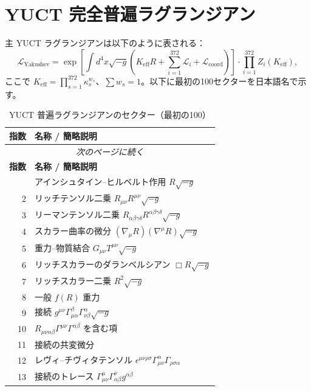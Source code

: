 \documentclass[13pt,a4paper]{ltjsarticle}
\begin{document}
	\section{YUCT 完全普遍ラグランジアン}
	主 YUCT ラグランジアンは以下のように表される：
	\begin{equation}
		\mathcal{L}_{\text{Yakushev}} = \exp\left[\int d^4x\sqrt{-g}\left(K_{\mathrm{eff}}R + \sum_{i=1}^{372}\mathcal{L}_i + \mathcal{L}_{\text{coord}}\right)\right] \cdot \prod_{i=1}^{372} Z_i(K_{\mathrm{eff}}),
	\end{equation}
	ここで \(K_{\mathrm{eff}} = \prod_{s=1}^{372} \kappa_s^{w_s}\)、\(\sum w_s = 1\)。以下に最初の100セクターを日本語名で示す。
	\scriptsize
	\begin{longtable}{r l}
		\caption{YUCT 普遍ラグランジアンのセクター（最初の100）}\label{tab:sectors}\\
		\toprule
		\textbf{指数} & \textbf{名称 / 簡略説明} \\
		\midrule
		\endfirsthead
		\multicolumn{2}{c}{\textit{次のページに続く}}\\
		\toprule
		\textbf{指数} & \textbf{名称 / 簡略説明} \\
		\midrule
		\endhead
		\bottomrule
		\endfoot
		1 & アインシュタイン–ヒルベルト作用 \(R\sqrt{-g}\) \\
		2 & リッチテンソル二乗 \(R_{\mu\nu}R^{\mu\nu}\sqrt{-g}\) \\
		3 & リーマンテンソル二乗 \(R_{\alpha\beta\gamma\delta}R^{\alpha\beta\gamma\delta}\sqrt{-g}\) \\
		4 & スカラー曲率の微分 \((\nabla_\mu R)(\nabla^\mu R)\sqrt{-g}\) \\
		5 & 重力–物質結合 \(G_{\mu\nu}T^{\mu\nu}\sqrt{-g}\) \\
		6 & リッチスカラーのダランベルシアン \(\Box R\sqrt{-g}\) \\
		7 & リッチスカラー二乗 \(R^2\sqrt{-g}\) \\
		8 & 一般 \(f(R)\) 重力 \\
		9 & 接続 \(g^{\mu\nu}\Gamma^{\beta}_{\mu\alpha}\Gamma^{\alpha}_{\nu\beta}\sqrt{-g}\) \\
		10 & \(R_{\mu\nu\alpha\beta}\Gamma^{\mu\nu}\Gamma^{\alpha\beta}\) を含む項 \\
		11 & 接続の共変微分 \\
		12 & レヴィ–チヴィタテンソル \(\epsilon^{\mu\nu\rho\sigma}\Gamma^{\alpha}_{\mu\nu}\Gamma_{\rho\sigma\alpha}\) \\
		13 & 接続のトレース \(\Gamma^{\mu}_{\mu\nu}\Gamma^{\nu}_{\alpha\beta}g^{\alpha\beta}\) \\

\end{longtable}
\end{document}
